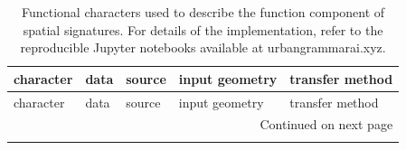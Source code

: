 \documentclass[fleqn,10pt]{wlscirep}
\begin{document}
\begin{longtable}{p{}p{}p{}p{}p{}}
    \caption{\label{tab:function}Functional characters used to
describe the function component of spatial signatures. For details of the implementation,
refer to the reproducible Jupyter notebooks available at urbangrammarai.xyz.}\\
    \toprule
                                                                                                character &                               data  &                                                                     source  &                    input geometry  &                                transfer method  \\
    \midrule
    \endfirsthead

    \toprule
                                                                                                character &                               data  &                                                                     source  &                    input geometry  &                                transfer method  \\
    \midrule
    \endhead
    \midrule
    \multicolumn{5}{r}{{Continued on next page}} \\
    \midrule
    \endfoot


\end{longtable}
\end{document}
